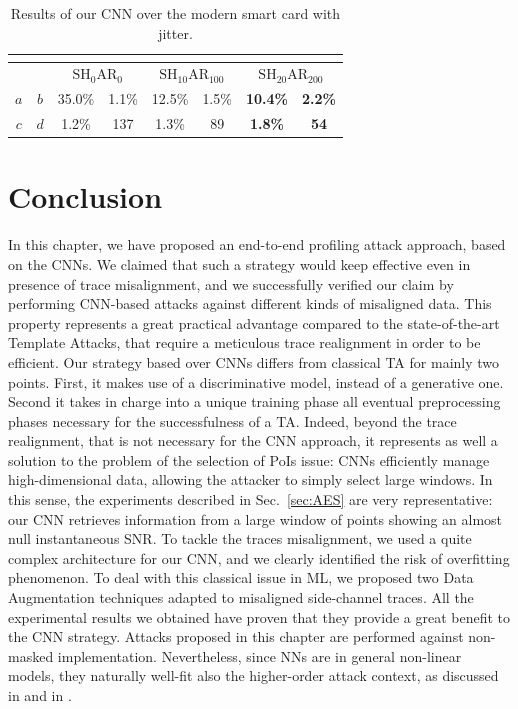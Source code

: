     

\begin{table}
\centering
\begin{tabular}{|c|c|c|c|c|c|c|c|}
\multicolumn{8}{c}{}\\
\hline
\multicolumn{2}{|c|}{} & \multicolumn{2}{c|}{$\mathrm{SH}_{0}\mathrm{AR}_{0}$} & \multicolumn{2}{c|}{$\mathrm{SH}_{10}\mathrm{AR}_{100}$} & \multicolumn{2}{c|}{$\mathrm{SH}_{20}\mathrm{AR}_{200}$} \\ \hline
$a$        & $b$       & 35.0\%                     & 1.1\%                    & 12.5\%                      & 1.5\%                      & \textbf{10.4\%}             & \textbf{2.2\%}             \\ \hline
$c$        & $d$       & 1.2\%                      & 137                      & 1.3\%                       & 89                         & \textbf{1.8\%}              & \textbf{54}                \\ \hline
\end{tabular}

\caption{Results of our CNN over the modern smart card with jitter.}\label{tab:res_AES}
\end{table}

  
\section{Conclusion}
In this chapter, we have proposed an end-to-end profiling attack approach, based on the CNNs. We claimed that such a strategy would keep effective even in presence of trace misalignment, and we successfully verified our claim by performing CNN-based attacks against different kinds of misaligned data. This property represents a great practical advantage compared to the state-of-the-art Template Attacks, that require a meticulous trace realignment in order to be efficient. Our strategy based over CNNs differs from classical TA for mainly two points. First, it makes use of a discriminative model, instead of a generative one. Second it takes in charge into a unique training phase all eventual preprocessing phases necessary for the successfulness of a TA. Indeed, beyond the trace realignment, that is not necessary for the CNN approach, it represents as well a solution to the problem of the selection of PoIs issue: CNNs efficiently manage high-dimensional data, allowing the attacker to simply  select large windows. In this sense, the experiments described in Sec.~\ref{sec:AES} are very representative: our CNN retrieves information from a large window of points showing an almost null instantaneous SNR. To tackle the traces misalignment, we used a quite complex architecture for our CNN, and we clearly identified the risk of overfitting phenomenon. To deal with this classical issue in ML, we proposed two Data Augmentation techniques adapted to misaligned side-channel traces. All the experimental results we obtained have proven that they provide a great benefit to the CNN strategy.  Attacks proposed in this chapter are performed against non-masked implementation. Nevertheless, since NNs are in general non-linear models, they naturally well-fit also the higher-order attack context, as discussed in \cite{maghrebi2016breaking} and in \cite{DLwhitepaper}.